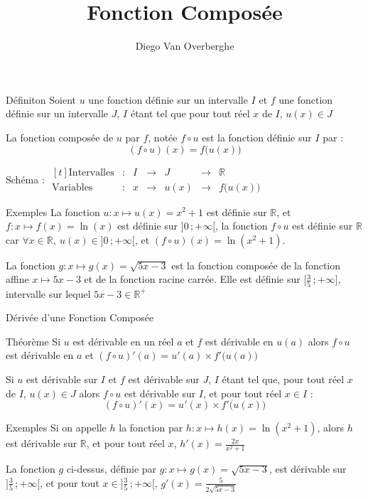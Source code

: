 \documentclass{cours}
\title{Fonction Composée}
\author{Diego Van Overberghe}
\begin{document}

    \begin{Gpartie}{Définiton} 
        Soient $u$ une fonction définie sur un intervalle $I$ et $f$ une fonction définie sur un intervalle $J$, $I$ étant tel que pour tout réel $x$ de $I$, $u(x)\in J$

        La fonction composée de $u$ par $f$, notée $f\circ u$ est la fonction définie sur $I$ par :
        \[(f\circ u)(x)=f\big(u(x)\big)\]

        Schéma : \qquad
        $\begin{aligned}[t]
            \text{Intervalles}  &:  &I  &\rightarrow    &J      &\rightarrow    &\mathbb{R} \\
            \text{Variables}    &:  &x  &\rightarrow    &u(x)   &\rightarrow    &f\big(u(x)\big)
        \end{aligned}$
        \vspace{2ex}
        \begin{Spartie}{Exemples} 
            La fonction $u:x\mapsto u(x)=x^2+1$ est définie sur $\mathbb{R}$, et $f:x\mapsto f(x)=\ln(x)$ est définie sur $\big]0\,;+\infty\big[$, la fonction $f\circ u$ est définie sur $\mathbb{R}$ car $\forall x\in\mathbb{R},\ u(x)\in\big]0\,;+\infty\big[$, et $(f\circ u)(x)=\ln(x^2+1)$.

            La fonction $g:x\mapsto g(x)=\sqrt{5x-3}$ est la fonction composée de la fonction affine $x\mapsto 5x-3$ et de la fonction racine carrée. Elle est définie sur $\Big[\frac{3}{5}\,;+\infty\Big]$, intervalle sur lequel $5x-3\in\mathbb{R^{+}}$
        \end{Spartie}
    \end{Gpartie}
    \begin{Gpartie}{Dérivée d'une Fonction Composée} 
        \begin{Spartie}{Théorème} 
            Si $u$ est dérivable en un réel $a$ et $f$ est dérivable en $u(a)$ alors $f\circ u$ est dérivable en $a$ et $(f\circ u)'(a)=u'(a)\times f'\big(u(a)\big)$

            Si $u$ est dérivable sur $I$ et $f$ est dérivable sur $J$, $I$ étant tel que, pour tout réel $x$ de $I$, $u(x)\in J$ alors $f\circ u$ est dérivable sur $I$, et pour tout réel $x\in I$ : \[(f\circ u)'(x)=u'(x)\times f'\big(u(x)\big)\] 
        \end{Spartie}
        \begin{Spartie}{Exemples} 
            Si on appelle $h$ la fonction par $h:x\mapsto h(x)=\ln(x^2+1)$, alors $h$ est dérivable sur $\mathbb{R}$, et pour tout réel $x$, $h'(x)=\frac{2x}{x^2+1}$

            La fonction $g$ ci-dessus, définie par $g:x\mapsto g(x)=\sqrt{5x-3}$, est dérivable sur $\Big]\frac{3}{5}\,;+\infty\Big[$, et pour tout $x\in\Big]\frac{3}{5}\,;+\infty\Big[$, $g'(x)=\frac{5}{2\sqrt{5x-3}}$
        \end{Spartie}
    \end{Gpartie}
\end{document}
